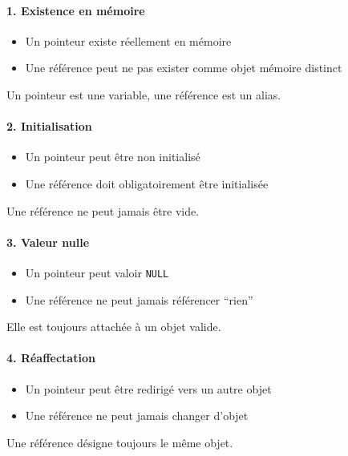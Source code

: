 \paragraph{1. Existence en mémoire}

\begin{itemize}
    \item Un pointeur existe réellement en mémoire
    \item Une référence peut ne pas exister comme objet mémoire distinct
\end{itemize}

Un pointeur est une variable,
une référence est un alias.

\paragraph{2. Initialisation}

\begin{itemize}
    \item Un pointeur peut être non initialisé
    \item Une référence doit obligatoirement être initialisée
\end{itemize}

Une référence ne peut jamais être vide.

\paragraph{3. Valeur nulle}

\begin{itemize}
    \item Un pointeur peut valoir \texttt{NULL}
    \item Une référence ne peut jamais référencer ``rien''
\end{itemize}

Elle est toujours attachée à un objet valide.

\paragraph{4. Réaffectation}

\begin{itemize}
    \item Un pointeur peut être redirigé vers un autre objet
    \item Une référence ne peut jamais changer d’objet
\end{itemize}

Une référence désigne toujours le même objet.

